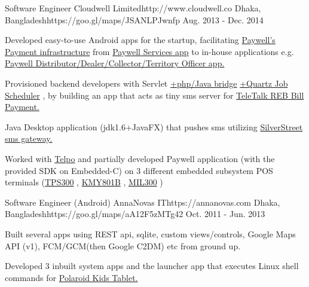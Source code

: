 \begin{workentries}
\workentry
{Software Engineer} %
{Cloudwell Limited}{http://www.cloudwell.co} %
{Dhaka, Bangladesh}{https://goo.gl/maps/JSANLPJwnfp} %
{Aug. 2013 - Dec. 2014} %
    {
      \begin{workitems} %
        \item {Developed easy-to-use Android apps for the startup, facilitating 
        {\href{https://www.paywellonline.com/web_paywell/index.php}{Paywell's Payment infrastructure}} 
        from 
        {\href{https://www.youtube.com/channel/UCf_R7aYkzyn_CGZw4xgkNEA}{Paywell Services app}}
        to in-house applications e.g.
        {\href{https://futurestartup.com/2018/03/13/the-evolution-of-cloudwell-clouldwells-strategy-and-ambition-an-interview-with-anisul-islam-founder-and-ceo-cloudwell/}
        {Paywell Distributor/Dealer/Collector/Territory Officer app.}}
        }
        \item {Provisioned backend developers with Servlet
        {\href{http://php-java-bridge.sourceforge.net/pjb/servlet-programming.php}{+php/Java bridge}}
        {\href{http://www.quartz-scheduler.org}{+Quartz Job Scheduler}}
        , by building an app that acts as tiny sms server for 
        {\href{http://www.teletalk.com.bd/dynamicLayout.jsp?page=40002&menuItem=7006}{TeleTalk REB Bill Payment.}}
        \item Java Desktop application (jdk1.6+JavaFX) that pushes sms utilizing 
        {\href{https://www.silverstreet.com}{SilverStreet sms gateway.}}
        }
        \item {Worked with 
        {\href{http://www.telpo.com.cn}{Telpo}}
        and partially developed Paywell application (with the provided SDK on Embedded-C) on 3 different embedded subsystem POS terminals 
        ({\href{https://www.alibaba.com/product-detail/-Telpo-TPS300-EFT-pos-GPRS_576805259.html}{TPS300}}
         , {\href{https://kmychina.en.made-in-china.com/product/xeyJnSQWglcs/China-GPRS-POS-with-PCI-Pinpad-KMY801B-.html}{KMY801B}}
         , {\href{http://movotek.com/products/pos-terminal-mil300/}{MIL300}}         
        )
        }
      \end{workitems}
    }

  \workentry
    {Software Engineer (Android)} %
    {AnnaNovas IT}{https://annanovas.com} %
    {Dhaka, Bangladesh}{https://goo.gl/maps/aA12F5zMTg42} %
    {Oct. 2011 - Jun. 2013} %
    {
      \begin{workitems} %
        \item {Built several apps using REST api, sqlite, custom views/controls, Google Maps API (v1), FCM/GCM(then Google C2DM) etc from ground up.}
        \item {Developed 3 inbuilt system apps and the launcher app that executes Linux shell commands for }
        {\href{https://www.polaroid.com/kids-tablet-2}{Polaroid Kids Tablet.}}
      \end{workitems}
    }

\end{workentries}
